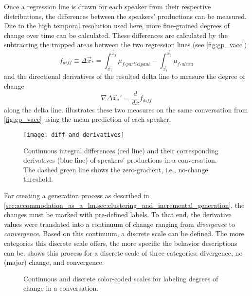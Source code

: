 Once a regression line is drawn for each speaker from their respective distributions, the differences between the speakers' productions can be measured.
Due to the high temporal resolution used here, more fine-grained degrees of change over time can be calculated.
These differences are calculated by the subtracting the trapped areas between the two regression lines (see \cref{fig:gp_vacc})
%
\begin{equation}
	f_{diff} \equiv\Delta\vec{x}_* =
	\int_{\vec{x}_i}^{\vec{x}_{j}}\mu_{f_*participant} -
	\int_{\vec{x}_i}^{\vec{x}_{j}}\mu_{f_*alexa}
\end{equation}
\noindent
%
and the directional derivatives of the resulted delta line to measure the degree of change
%
\begin{equation}
	\nabla\Delta\vec{x}_*' = \frac{d}{dx}f_{diff}
\end{equation}
%
along the delta line.
 illustrates these two measures on the same conversation from \cref{fig:gp_vacc} using the mean prediction of each speaker.
%
\begin{figure}[t]
	\centering
	\texttt{[image: diff\_and\_derivatives]}
	\caption[Continuous integral differences and derivatives in a \acl{hci}]
		{Continuous integral differences (red line) and their corresponding derivatives (blue line) of speakers' productions in a conversation.
		The dashed green line shows the zero-gradient, i.e., no-change threshold.}
	\label{fig:diff_and_derivatives}
\end{figure}
%
For creating a generation process as described in \cref{sec:accommodation_as_a_lm,sec:clustering_and_incremental_generation}, the changes must be marked with pre-defined labels.
To that end, the derivative values were translated into a continuum of change ranging from \textit{divergence} to \textit{convergence}.
Based on this continuum, a discrete scale can be defined.
The more categories this discrete scale offers, the more specific the behavior descriptions can be.
 shows this process for a discrete scale of three categories: divergence, no (major) change, and convergence.
%
\begin{figure}[t]
	\centering
	\hfill
	\caption[Continuous and discrete scales for labeling degrees of change]
		{Continuous and discrete color-coded scales for labeling degrees of change in a conversation.}
	\label{fig:cont_disc_scales}
\end{figure}

